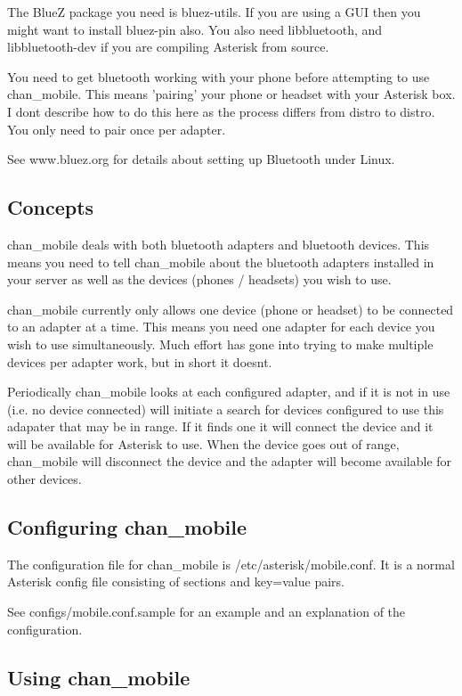 The BlueZ package you need is bluez-utils. If you are using a GUI then you might want to install bluez-pin also.
You also need libbluetooth, and libbluetooth-dev if you are compiling Asterisk from source.

You need to get bluetooth working with your phone before attempting to use chan\_mobile.
This means 'pairing' your phone or headset with your Asterisk box. I dont describe how to do this here as the process
differs from distro to distro. You only need to pair once per adapter.

See www.bluez.org for details about setting up Bluetooth under Linux.


\subsection{Concepts}

chan\_mobile deals with both bluetooth adapters and bluetooth devices. This means you need to tell chan\_mobile about the
bluetooth adapters installed in your server as well as the devices (phones / headsets) you wish to use.

chan\_mobile currently only allows one device (phone or headset) to be connected to an adapter at a time. This means you need
one adapter for each device you wish to use simultaneously. Much effort has gone into trying to make multiple devices per adapter
work, but in short it doesnt.

Periodically chan\_mobile looks at each configured adapter, and if it is not in use (i.e. no device connected) will initiate a
search for devices configured to use this adapater that may be in range. If it finds one it will connect the device and it
will be available for Asterisk to use. When the device goes out of range, chan\_mobile will disconnect the device and the adapter
will become available for other devices.


\subsection{Configuring chan\_mobile}

The configuration file for chan\_mobile is /etc/asterisk/mobile.conf. It is a normal Asterisk config file consisting of sections and key=value pairs.

See configs/mobile.conf.sample for an example and an explanation of the configuration.


\subsection{Using chan\_mobile}

